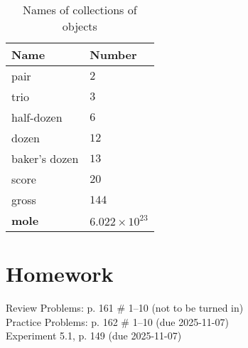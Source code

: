 \documentclass[11pt, oneside]{article}   	%
\begin{document}
\begin{table}[p]
\centering
\begin{tabular}[b]{l|l}
\hline
Name & Number \\
\hline
pair  & $2$ \\
trio  & $3$ \\ 
half-dozen & $6$ \\
dozen & $12$ \\
baker's dozen & $13$ \\
score & $20$ \\
gross & $144$ \\
\textbf{mole}   & \textbf{$6.022 \times 10^{23}$}\\
\end{tabular}
\caption{Names of collections of objects}
\label{table:collections:names}
\end{table}


\section{Homework}
Review Problems: p. 161 \# 1--10 (not to be turned in)\\
Practice Problems: p. 162 \# 1--10 (due 2025-11-07)\\
Experiment 5.1, p. 149 (due 2025-11-07)\\


\nocite{wile-chem-2}
{}

\end{document}
